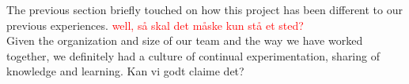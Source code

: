 The previous section briefly touched on how this project has been different to our previous experiences. \textcolor{red}{ well, så skal det måske kun stå et sted?} \\

Given the organization and size of our team and the way we have worked together, we definitely had a culture of continual experimentation, sharing of knowledge and learning. Kan vi godt claime det? 
